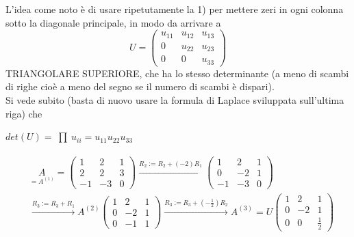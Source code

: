 \documentclass[12pt,a4paper]{article}
\newcommand{\inter}{\begin{matrix}\prod\end{matrix}}
\begin{document}
L'idea come noto è di usare ripetutamente la 1) per mettere zeri in ogni colonna sotto la diagonale principale, in modo da arrivare a 
\begin{equation*}
    U = \begin{pmatrix}
        u_{11} & u_{12} & u_{13} \\
        0 & u_{22} & u_{23} \\
        0 & 0 & u_{33}
    \end{pmatrix}
\end{equation*}
TRIANGOLARE SUPERIORE, che ha lo stesso determinante (a meno di scambi di righe cioè a meno del segno se il numero di scambi è dispari).\\
Si vede subito (basta di nuovo usare la formula di Laplace sviluppata sull'ultima riga) che
\begin{center}
    $det(U) = \inter u_{ii} = u_{11} u_{22} u_{33}$
\end{center}
\begin{equation*}
    \begin{split}
        & \underset{=A^{(1)}}{A}=\begin{pmatrix}
              1 & 2 & 1 \\
              2 & 2 & 3 \\
              -1 & -3 & 0
        \end{pmatrix} \overset{R_2 := R_2 + (-2) R_1}{\longrightarrow} \begin{pmatrix}
                  1 & 2 & 1 \\
                  0 & -2 & 1 \\
                 -1 & -3 & 0
        \end{pmatrix} \\
        & \overset{R_3 := R_3 + R_1}{\longrightarrow} A^{(2)} \begin{pmatrix}
                  1 & 2 & 1 \\
                  0 & -2 & 1 \\
                  0 & -1 & 1
        \end{pmatrix} \overset{R_3 := R_3 + ( -\frac{1}{2}) R_2}{\longrightarrow} A^{(3)} = U \begin{pmatrix}
                  1 & 2 & 1 \\
                  0 & -2 & 1 \\
                  0 & 0 & \frac{1}{2}
        \end{pmatrix}
    \end{split}
\end{equation*}
\end{document}
